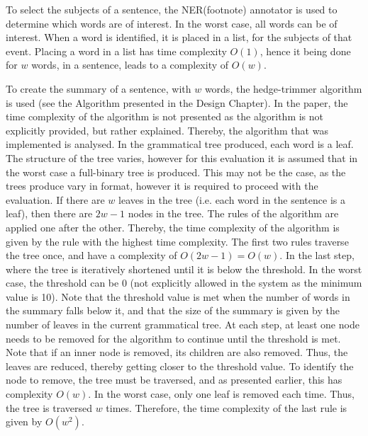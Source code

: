 \par To select the subjects of a sentence, the NER(footnote) annotator is used to determine which words are of interest. In the worst case, all words can be of interest. When a word is identified, it is placed in a list, for the subjects of that event. Placing a word in a list has time complexity $O(1)$, hence it being done for $w$ words, in a sentence, leads to a complexity of $O(w)$.

\par To create the summary of a sentence, with $w$ words, the hedge-trimmer algorithm is used (see the Algorithm presented in the Design Chapter). In the paper, the time complexity of the algorithm is not presented as the algorithm is not explicitly provided, but rather explained. Thereby, the algorithm that was implemented is analysed. In the grammatical tree produced, each word is a leaf. The structure of the tree varies, however for this evaluation it is assumed that in the worst case a full-binary tree is produced. This may not be the case, as the trees produce vary in format, however it is required to proceed with the evaluation. If there are $w$ leaves in the tree (i.e. each word in the sentence is a leaf), then there are $2w-1$ nodes in the tree. The rules of the algorithm are applied one after the other. Thereby, the time complexity of the algorithm is given by the rule with the highest time complexity. The first two rules traverse the tree once, and have a complexity of $O(2w-1) = O(w)$. In the last step, where the tree is iteratively shortened until it is below the threshold. In the worst case, the threshold can be 0 (not explicitly allowed in the system as the minimum value is 10). Note that the threshold value is met when the number of words in the summary falls below it, and that the size of the summary is given by the number of leaves in the current grammatical tree. At each step, at least one node needs to be removed for the algorithm to continue until the threshold is met. Note that if an inner node is removed, its children are also removed. Thus, the leaves are reduced, thereby getting closer to the threshold value. To identify the node to remove, the tree must be traversed, and as presented earlier, this has complexity $O(w)$. In the worst case, only one leaf is removed each time. Thus, the tree is traversed $w$ times. Therefore, the time complexity of the last rule is given by $O(w^2)$.

